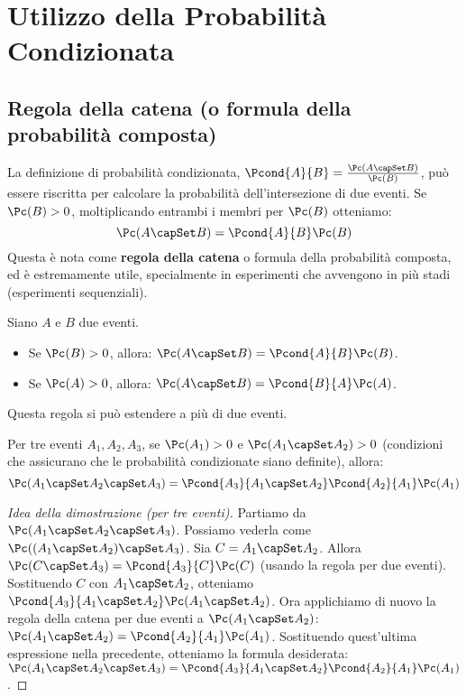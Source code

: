 \section{Utilizzo della Probabilità Condizionata}

\subsection{Regola della catena (o formula della probabilità composta)}
La definizione di probabilità condizionata, $\Pcond{A}{B} = \frac{\Pc(A \capSet B)}{\Pc(B)}$, può essere riscritta per calcolare la probabilità dell'intersezione di due eventi. Se $\Pc(B)>0$, moltiplicando entrambi i membri per $\Pc(B)$ otteniamo:
\[ \Pc(A \capSet B) = \Pcond{A}{B} \Pc(B) \]
Questa è nota come \textbf{regola della catena} o formula della probabilità composta, ed è estremamente utile, specialmente in esperimenti che avvengono in più stadi (esperimenti sequenziali).

\begin{theorem}
Siano $A$ e $B$ due eventi.
\begin{itemize}
    \item Se $\Pc(B) > 0$, allora: $\Pc(A \capSet B) = \Pcond{A}{B} \Pc(B)$.
    \item Se $\Pc(A) > 0$, allora: $\Pc(A \capSet B) = \Pcond{B}{A} \Pc(A)$.
\end{itemize}
\end{theorem}

Questa regola si può estendere a più di due eventi.
\begin{theorem}
Per tre eventi $A_1, A_2, A_3$, se $\Pc(A_1) > 0$ e $\Pc(A_1 \capSet A_2) > 0$ (condizioni che assicurano che le probabilità condizionate siano definite), allora:
\[ \Pc(A_1 \capSet A_2 \capSet A_3) = \Pcond{A_3}{A_1 \capSet A_2} \Pcond{A_2}{A_1} \Pc(A_1) \]
\end{theorem}
\begin{proof}[Idea della dimostrazione (per tre eventi)]
Partiamo da $\Pc(A_1 \capSet A_2 \capSet A_3)$. Possiamo vederla come $\Pc((A_1 \capSet A_2) \capSet A_3)$.
Sia $C = A_1 \capSet A_2$. Allora $\Pc(C \capSet A_3) = \Pcond{A_3}{C} \Pc(C)$ (usando la regola per due eventi).
Sostituendo $C$ con $A_1 \capSet A_2$, otteniamo $\Pcond{A_3}{A_1 \capSet A_2} \Pc(A_1 \capSet A_2)$.
Ora applichiamo di nuovo la regola della catena per due eventi a $\Pc(A_1 \capSet A_2)$:
$\Pc(A_1 \capSet A_2) = \Pcond{A_2}{A_1} \Pc(A_1)$.
Sostituendo quest'ultima espressione nella precedente, otteniamo la formula desiderata:
$\Pc(A_1 \capSet A_2 \capSet A_3) = \Pcond{A_3}{A_1 \capSet A_2} \Pcond{A_2}{A_1} \Pc(A_1)$.
\end{proof}


